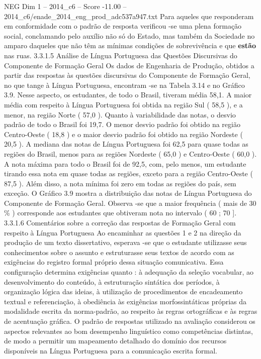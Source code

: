 \begin{textsample}{NEG Dim 1 – 2014\_c6 – Score -11.00 – 2014\_c6/enade\_2014\_eng\_prod\_adc537a947.txt}
Para aqueles que responderam em conformidade com o padrão de resposta verificou -se uma plena formação social, conclamando pelo auxílio não só do Estado, mas também da Sociedade no amparo daqueles que não têm as mínimas condições de sobrevivência e que \textbf{estão} nas ruas. 3.3.1.5 Análise de Língua Portuguesa das Questões Discursivas do Componente de Formação Geral Os dados de Engenharia de Produção, obtidos a partir das respostas às questões discursivas do Componente de Formação Geral, no que tange à Língua Portuguesa, encontram -se na Tabela 3.14 e no Gráfico 3.9.
Nesse aspecto, os estudantes, de todo o Brasil, tiveram média 58,1.
A maior média com respeito à Língua Portuguesa foi obtida na região Sul ( 58,5 ), e a menor, na região Norte ( 57,0 ).
Quanto à variabilidade das notas, o desvio padrão de todo o Brasil foi 19,7.
O menor desvio padrão foi obtido na região Centro-Oeste ( 18,8 ) e o maior desvio padrão foi obtido na região Nordeste ( 20,5 ).
A mediana das notas de Língua Portuguesa foi 62,5 para quase todas as regiões do Brasil, menos para as regiões Nordeste ( 65,0 ) e Centro-Oeste ( 60,0 ).
A nota máxima para todo o Brasil foi de 92,5, com, pelo menos, um estudante tirando essa nota em quase todas as regiões, exceto para a região Centro-Oeste ( 87,5 ).
Além disso, a nota mínima foi zero em todas as regiões do país, sem exceção.
O Gráfico 3.9 mostra a distribuição das notas de Língua Portuguesa do Componente de Formação Geral.
Observa -se que a maior frequência ( mais de 30 \% ) corresponde aos estudantes que obtiveram nota no intervalo ( 60 ; 70 ]. 3.3.1.6 Comentários sobre a correção das respostas de Formação Geral com respeito à Língua Portuguesa Ao encaminhar as questões 1 e 2 na direção da produção de um texto dissertativo, esperava -se que o estudante utilizasse seus conhecimentos sobre o assunto e estruturasse seus textos de acordo com as exigências do registro formal próprio dessa situação comunicativa.
Essa configuração determina exigências quanto : à adequação da seleção vocabular, ao desenvolvimento do conteúdo, à estruturação sintática dos períodos, à organização lógica das ideias, à utilização de procedimentos de encadeamento textual e referenciação, à obediência às exigências morfossintáticas próprias da modalidade escrita da norma-padrão, ao respeito às regras ortográficas e às regras de acentuação gráfica.
O padrão de respostas utilizado na avaliação considerou os aspectos relevantes ao bom desempenho linguístico como competências distintas, de modo a permitir um mapeamento detalhado do domínio dos recursos disponíveis na Língua Portuguesa para a comunicação escrita formal.

\end{textsample}
